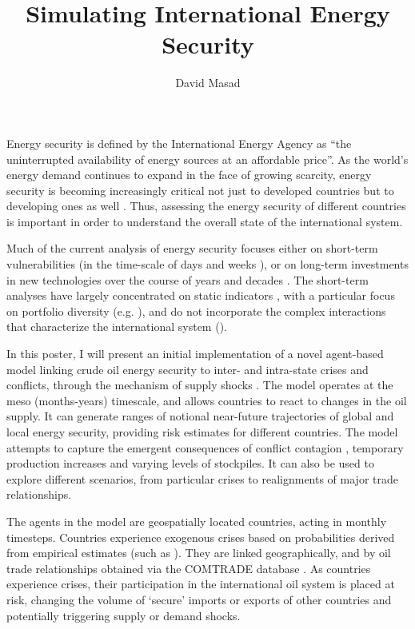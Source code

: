 \documentclass{llncs}
\begin{document}
\title{Simulating International Energy Security}
	\author{David Masad}
	\maketitle


Energy security is defined by the International Energy Agency as ``the uninterrupted availability of energy sources at an affordable price''\cite{iea_2013}. As the world's energy demand continues to expand in the face of growing scarcity, energy security is becoming increasingly critical not just to developed countries but to developing ones as well \cite{yergin_2006}. Thus, assessing the energy security of different countries is important in order to understand the overall state of the international system.

Much of the current analysis of energy security focuses either on short-term vulnerabilities (in the time-scale of days and weeks \cite{Jewell_2011}), or on long-term investments in new technologies over the course of years and decades \cite{jacobson_2009}. The short-term analyses have largely concentrated on static indicators \cite{Jewell_2011}, with a particular focus on portfolio diversity (e.g. \cite{wu_2009,skea_2010,stirling_2010}), and do not incorporate the complex interactions that characterize the international system (\cite{cederman_1997,geller_2011}).

In this poster, I will present an initial implementation of a novel agent-based model linking crude oil energy security to inter- and intra-state crises and conflicts, through the mechanism of supply shocks \cite{kilian_2008}. The model operates at the meso (months-years) timescale, and allows countries to react to changes in the oil supply. It can generate ranges of notional near-future trajectories of global and local energy security, providing risk estimates for different countries. The model attempts to capture the emergent consequences of conflict contagion \cite{black_2013}, temporary production increases and varying levels of stockpiles. It can also be used to explore different scenarios, from particular crises to realignments of major trade relationships. 

The agents in the model are geospatially located countries, acting in monthly timesteps. Countries experience exogenous crises based on probabilities derived from empirical estimates (such as \cite{goldstone_2005,eiu_2013,ward_2013}). They are linked geographically, and by oil trade relationships obtained via the COMTRADE database \cite{un_2013}. As countries experience crises, their participation in the  international oil system is placed at risk, changing the volume of `secure' imports or exports of other countries and  potentially triggering supply or demand shocks. 
\end{document}
